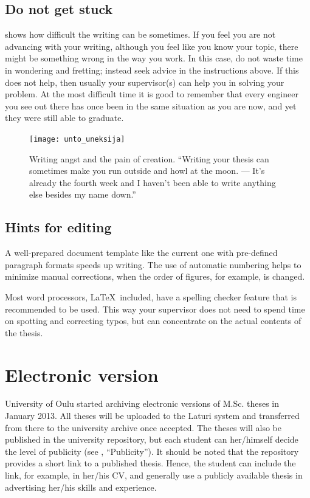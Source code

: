 \subsection{Do not get stuck}

 shows how difficult the writing can be sometimes. If you feel you are not advancing with your writing, although you feel like you know your topic, there might be something wrong in the way you work. In this case, do not waste time in wondering and fretting; instead seek advice in the instructions above. If this does not help, then usually your supervisor(s) can help you in solving your problem. At the most difficult time it is good to remember that every engineer you see out there has once been in the same situation as you are now, and yet they were still able to graduate.

\begin{figure}[ht]
  \begin{center}
    \texttt{[image: unto\_uneksija]}
  \end{center}
  \caption{Writing angst and the pain of creation. “Writing your thesis can sometimes
make you run outside and howl at the moon. --- It’s already the fourth week and I
haven’t been able to write anything else besides my name down.”}
  \label{fig:unto_uneksija}
\end{figure}

\subsection{Hints for editing}

A well-prepared document template like the current one with pre-defined paragraph formats speeds up writing. The use of automatic numbering helps to minimize manual corrections, when the order of figures, for example, is changed.

Most word processors, \LaTeX\ included, have a spelling checker feature that is recommended to be used. This way your supervisor does not need to spend time on spotting and correcting typos, but can concentrate on the actual contents of the thesis.

\section{Electronic version}

University of Oulu started archiving electronic versions of M.Sc. theses in January 2013. All theses will be uploaded to the Laturi system and transferred from there to the university archive once accepted. The theses will also be published in the university repository, but each student can her/himself decide the level of publicity (see , “Publicity”). It should be noted that the repository provides a short link to a published thesis. Hence, the student can include the link, for example, in her/his CV, and generally use a publicly available thesis in advertising her/his skills and experience.


